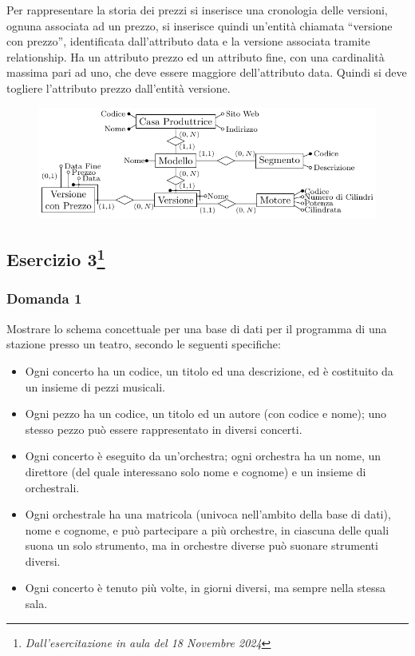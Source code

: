 \documentclass{article}
\begin{document}
Per rappresentare la storia dei prezzi si inserisce una cronologia delle versioni, ognuna associata ad un prezzo, si inserisce quindi un'entità 
chiamata ``versione con prezzo'', identificata dall'attributo data e la versione associata tramite relationship. Ha un attributo prezzo ed un 
attributo fine, con una cardinalità massima pari ad uno, che deve essere maggiore dell'attributo data. Quindi si deve togliere l'attributo prezzo 
dall'entità versione. 

\begin{figure}[H]%
    \centering%
    \includegraphics[scale=1.24]{schema_er_es_2_2.pdf}%
\end{figure}

\subsection{Esercizio 3\footnote{\textit{Dall'esercitazione in aula del 18 Novembre 2024}}}

\subsubsection*{Domanda 1}

Mostrare lo schema concettuale per una base di dati per il programma di una stazione presso un teatro, secondo le seguenti specifiche:
\begin{itemize}
    \item Ogni concerto ha un codice, un titolo ed una descrizione, ed è costituito da un insieme di pezzi musicali. 
    \item Ogni pezzo ha un codice, un titolo ed un autore (con codice e nome); uno stesso pezzo può essere rappresentato in diversi concerti. 
    \item Ogni concerto è eseguito da un'orchestra; ogni orchestra ha un nome, un direttore (del quale interessano solo nome e cognome) e un insieme di orchestrali. 
    \item Ogni orchestrale ha una matricola (univoca nell'ambito della base di dati), nome e cognome, e può partecipare a più orchestre, in ciascuna delle quali suona un solo strumento, ma in orchestre diverse può suonare strumenti diversi. 
    \item Ogni concerto è tenuto più volte, in giorni diversi, ma sempre nella stessa sala. 
\end{itemize}
\end{document}
